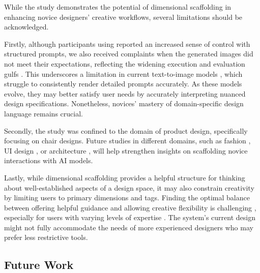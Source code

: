 While the study demonstrates the potential of dimensional scaffolding in enhancing novice designers’ creative workflows, several limitations should be acknowledged. 

Firstly, although participants using \toolname{} reported an increased sense of control with structured prompts, we also received complaints when the generated images did not meet their expectations, reflecting the widening execution and evaluation gulfs \cite{subramonyam2024bridging}. This underscores a limitation in current text-to-image models \cite{lee2024holistic}, which struggle to consistently render detailed prompts accurately. As these models evolve, they may better satisfy user needs by accurately interpreting nuanced design specifications. Nonetheless, novices' mastery of domain-specific design language remains crucial.

Secondly, the study was confined to the domain of product design, specifically focusing on chair designs. Future studies in different domains, such as fashion \cite{jeon2021fashionq}, UI design \cite{vaithilingam2024dynavis}, or architecture \cite{aseniero2024experiential, zhang2023generative}, will help strengthen insights on scaffolding novice interactions with AI models. 

Lastly, while dimensional scaffolding provides a helpful structure for thinking about well-established aspects of a design space, it may also constrain creativity by limiting users to primary dimensions and tags. Finding the optimal balance between offering helpful guidance and allowing creative flexibility is challenging \cite{chi2014nature}, especially for users with varying levels of expertise \cite{cross2004expertise, ericsson2009development}. The system’s current design might not fully accommodate the needs of more experienced designers who may prefer less restrictive tools.

\subsection{Future Work}

